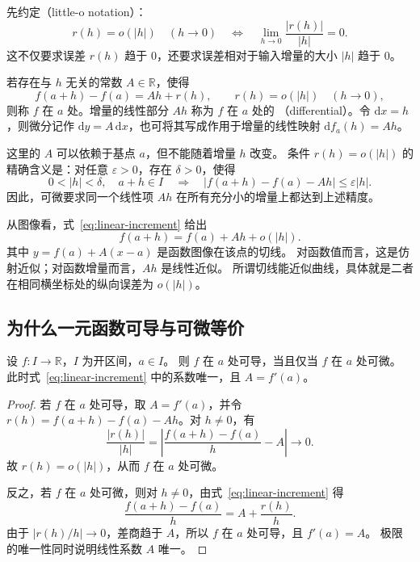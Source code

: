 \documentclass{ctexart}
\begin{document}
先约定（little-o notation）：
\[
  r(h)=o(|h|)\quad(h\to0)
  \quad\Longleftrightarrow\quad
  \lim_{h\to0}\frac{|r(h)|}{|h|}=0.
\]
这不仅要求误差 $r(h)$ 趋于 $0$，还要求误差相对于输入增量的大小 $|h|$ 趋于 $0$。

\begin{definition}[可微与微分]
\label{def:differentiability}
若存在与 $h$ 无关的常数 $A\in\mathbb R$，使得
\begin{equation}\label{eq:linear-increment}
  f(a+h)-f(a)=Ah+r(h),\qquad r(h)=o(|h|)\quad(h\to0),
\end{equation}
则称 $f$ 在 $a$ 处。增量的线性部分 $Ah$ 称为 $f$ 在 $a$ 处的
（differential）。令 $\mathrm dx=h$，则微分记作
$\mathrm dy=A\,\mathrm dx$，也可将其写成作用于增量的线性映射 $\mathrm df_a(h)=Ah$。
\end{definition}

这里的 $A$ 可以依赖于基点 $a$，但不能随着增量 $h$ 改变。
条件 $r(h)=o(|h|)$ 的精确含义是：对任意 $\varepsilon>0$，存在 $\delta>0$，使得
\[
  0<|h|<\delta,\quad a+h\in I
  \quad\Longrightarrow\quad
  |f(a+h)-f(a)-Ah|\le\varepsilon|h|.
\]
因此，可微要求同一个线性项 $Ah$ 在所有充分小的增量上都达到上述精度。

从图像看，式~\eqref{eq:linear-increment} 给出
\[
  f(a+h)=f(a)+Ah+o(|h|).
\]
其中 $y=f(a)+A(x-a)$ 是函数图像在该点的切线。
对函数值而言，这是仿射近似；对函数增量而言，$Ah$ 是线性近似。
所谓切线能近似曲线，具体就是二者在相同横坐标处的纵向误差为 $o(|h|)$。

\subsection{为什么一元函数可导与可微等价}

\begin{theorem}[一元函数可导与可微的等价性]
\label{thm:equivalence}
设 $f:I\to\mathbb R$，$I$ 为开区间，$a\in I$。
则 $f$ 在 $a$ 处可导，当且仅当 $f$ 在 $a$ 处可微。
此时式~\eqref{eq:linear-increment} 中的系数唯一，且 $A=f'(a)$。
\end{theorem}

\begin{proof}
若 $f$ 在 $a$ 处可导，取 $A=f'(a)$，并令
$r(h)=f(a+h)-f(a)-Ah$。对 $h\ne0$，有
\[
  \frac{|r(h)|}{|h|}
  =\left|\frac{f(a+h)-f(a)}{h}-A\right|\longrightarrow0.
\]
故 $r(h)=o(|h|)$，从而 $f$ 在 $a$ 处可微。

反之，若 $f$ 在 $a$ 处可微，则对 $h\ne0$，由式~\eqref{eq:linear-increment} 得
\[
  \frac{f(a+h)-f(a)}{h}=A+\frac{r(h)}{h}.
\]
由于 $|r(h)/h|\to0$，差商趋于 $A$，所以 $f$ 在 $a$ 处可导，且 $f'(a)=A$。
极限的唯一性同时说明线性系数 $A$ 唯一。
\end{proof}
\end{document}
